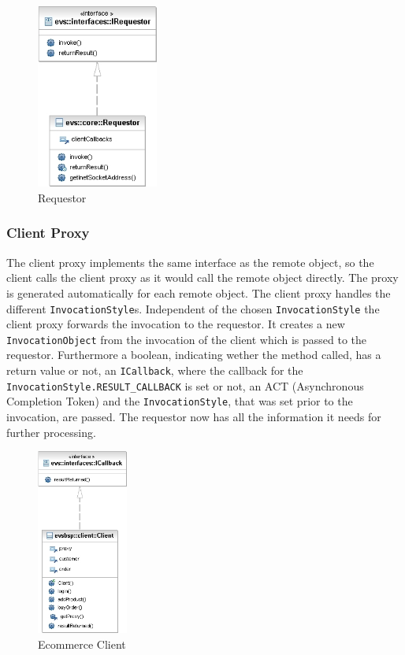\begin{figure}[ht!]
	\centering\includegraphics[width=4cm]{uml/Requestor.jpg} 
	\caption{Requestor}
	\label{fig:requestor}
\end{figure}

\subsubsection{Client Proxy}

The client proxy implements the same interface as the remote object, so the client calls the client proxy as it would call the remote object directly. The proxy is generated automatically for each remote object. The client proxy handles the different \texttt{InvocationStyle}s. Independent of the chosen \texttt{InvocationStyle} the client proxy forwards the invocation to the requestor. It creates a new \texttt{InvocationObject} from the invocation of the client which is passed to the requestor. Furthermore a boolean, indicating wether the method called, has a return value or not, an \texttt{ICallback}, where the callback for the \texttt{InvocationStyle.RESULT\_CALLBACK} is set or not, an ACT (Asynchronous Completion Token) and the \texttt{InvocationStyle}, that was set prior to the invocation, are passed. The requestor now has all the information it needs for further processing.

\begin{figure}[ht!]
	\centering\includegraphics[width=3cm]{uml/Client.jpg} 
	\caption{Ecommerce Client}
	\label{fig:client}
\end{figure}


